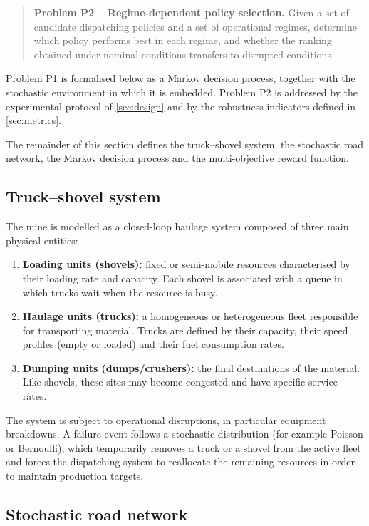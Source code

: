 \documentclass[11pt,a4paper]{article}
\begin{document}
\begin{quote}
\textbf{Problem P2 -- Regime-dependent policy selection.}
Given a set of candidate dispatching policies and a set of operational regimes, determine which policy performs best in each regime, and whether the ranking obtained under nominal conditions transfers to disrupted conditions.
\end{quote}

Problem P1 is formalised below as a Markov decision process, together with the stochastic environment in which it is embedded. Problem P2 is addressed by the experimental protocol of \cref{sec:design} and by the robustness indicators defined in \cref{sec:metrics}.

The remainder of this section defines the truck--shovel system, the stochastic road network, the Markov decision process and the multi-objective reward function.

\subsection{Truck--shovel system}

The mine is modelled as a closed-loop haulage system composed of three main physical entities:

\begin{enumerate}
  \item \textbf{Loading units (shovels):} fixed or semi-mobile resources characterised by their loading rate and capacity. Each shovel is associated with a queue in which trucks wait when the resource is busy.
  \item \textbf{Haulage units (trucks):} a homogeneous or heterogeneous fleet responsible for transporting material. Trucks are defined by their capacity, their speed profiles (empty or loaded) and their fuel consumption rates.
  \item \textbf{Dumping units (dumps/crushers):} the final destinations of the material. Like shovels, these sites may become congested and have specific service rates.
\end{enumerate}

The system is subject to operational disruptions, in particular equipment breakdowns. A failure event follows a stochastic distribution (for example Poisson or Bernoulli), which temporarily removes a truck or a shovel from the active fleet and forces the dispatching system to reallocate the remaining resources in order to maintain production targets.

\subsection{Stochastic road network}
\end{document}
